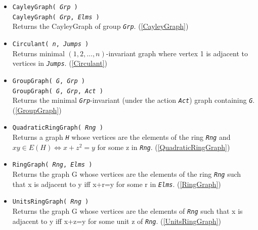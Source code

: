 \documentclass[a4paper,11pt]{report}
\begin{document}
{{\begin{itemize}
\item \texttt{CayleyGraph( \mbox{\texttt{\mdseries\slshape Grp}} )}\\
 \texttt{CayleyGraph( \mbox{\texttt{\mdseries\slshape Grp}}, \mbox{\texttt{\mdseries\slshape Elms}} )}\\
 Returns the CayleyGraph of group \mbox{\texttt{\mdseries\slshape Grp}}. (\ref{CayleyGraph}) 
\item \texttt{Circulant( \mbox{\texttt{\mdseries\slshape n}}, \mbox{\texttt{\mdseries\slshape Jumps}} )}\\
 Returns minimal $(1, 2, ..., n)$-invariant graph where vertex 1 is adjacent to vertices in \mbox{\texttt{\mdseries\slshape Jumps}}. (\ref{Circulant}) 
\item \texttt{GroupGraph( \mbox{\texttt{\mdseries\slshape G}}, \mbox{\texttt{\mdseries\slshape Grp}} )}\\
 \texttt{GroupGraph( \mbox{\texttt{\mdseries\slshape G}}, \mbox{\texttt{\mdseries\slshape Grp}}, \mbox{\texttt{\mdseries\slshape Act}} )}\\
 Returns the minimal \mbox{\texttt{\mdseries\slshape Grp}}-invariant (under the action \mbox{\texttt{\mdseries\slshape Act}}) graph containing \mbox{\texttt{\mdseries\slshape G}}. (\ref{GroupGraph}) 
\item \texttt{QuadraticRingGraph( \mbox{\texttt{\mdseries\slshape Rng}} )}\\
 Returns a graph \mbox{\texttt{\mdseries\slshape H}} whose vertices are the elements of the ring \mbox{\texttt{\mdseries\slshape Rng}} and $xy\in E(H) \iff x+z^2=y$ for some z in \mbox{\texttt{\mdseries\slshape Rng}}. (\ref{QuadraticRingGraph}) 
\item \texttt{RingGraph( \mbox{\texttt{\mdseries\slshape Rng}}, \mbox{\texttt{\mdseries\slshape Elms}} )}\\
 Returns the graph G whose vertices are the elements of the ring \mbox{\texttt{\mdseries\slshape Rng}} such that x is adjacent to y iff x+r=y for some r in \mbox{\texttt{\mdseries\slshape Elms}}. (\ref{RingGraph}) 
\item \texttt{UnitsRingGraph( \mbox{\texttt{\mdseries\slshape Rng}} )}\\
 Returns the graph G whose vertices are the elements of \mbox{\texttt{\mdseries\slshape Rng}} such that x is adjacent to y iff x+z=y for some unit z of \mbox{\texttt{\mdseries\slshape Rng}}. (\ref{UnitsRingGraph}) 
\end{itemize}
 }

}
\end{document}
